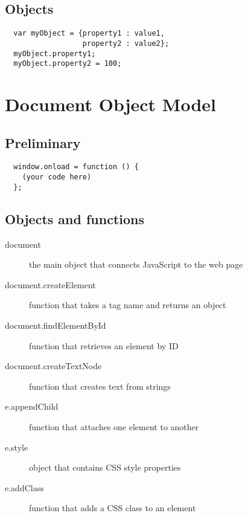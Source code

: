 \documentclass[letterpage,foldmark,10pt,notumble]{leaflet}
\begin{document}
\subsection{Objects}
\begin{verbatim}
  var myObject = {property1 : value1, 
                  property2 : value2};
  myObject.property1;
  myObject.property2 = 100;
\end{verbatim}
\section{Document Object Model}
\subsection{Preliminary}
\begin{verbatim}
  window.onload = function () {
    (your code here)
  };
\end{verbatim}
\subsection{Objects and functions}
\begin{description}
  \item [document] the main object that connects JavaScript to the web page
  \item [document.createElement] function that takes a tag name and returns an object
  \item [document.findElementById] function that retrieves an element by ID
  \item [document.createTextNode] function that creates text from strings
  \item [e.appendChild] function that attaches one element to another
  \item [e.style] object that contains CSS style properties
  \item [e.addClass] function that adds a CSS class to an element
\end{description}
\end{document}
